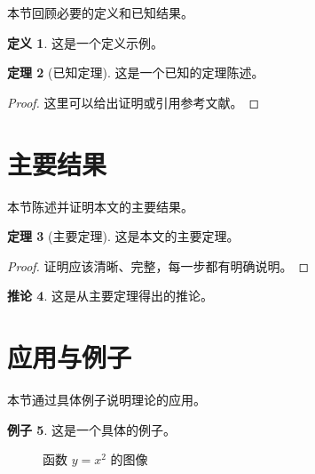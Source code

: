 \documentclass[12pt,a4paper]{article}
\theoremstyle{definition}
\newtheorem{theorem}{定理}[section]
\newtheorem{corollary}[theorem]{推论}
\newtheorem{definition}[theorem]{定义}
\newtheorem{example}[theorem]{例子}
\begin{document}
本节回顾必要的定义和已知结果。

\begin{definition}\label{def:example}
这是一个定义示例。
\end{definition}

\begin{theorem}[已知定理]\label{thm:known}
这是一个已知的定理陈述。
\end{theorem}

\begin{proof}
这里可以给出证明或引用参考文献。
\end{proof}

\section{主要结果}\label{sec:main}

本节陈述并证明本文的主要结果。

\begin{theorem}[主要定理]\label{thm:main}
这是本文的主要定理。
\end{theorem}

\begin{proof}
证明应该清晰、完整，每一步都有明确说明。
\end{proof}

\begin{corollary}\label{cor:main}
这是从主要定理得出的推论。
\end{corollary}

\section{应用与例子}\label{sec:applications}

本节通过具体例子说明理论的应用。

\begin{example}
这是一个具体的例子。
\end{example}

\begin{figure}[htbp]
    \centering
    \caption{函数 $y=x^2$ 的图像}
    \label{fig:example}
\end{figure}
\end{document}
